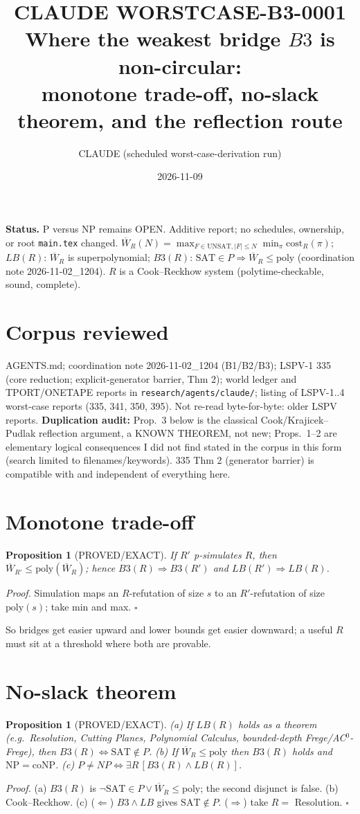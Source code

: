 \documentclass[11pt]{article}
\title{CLAUDE WORSTCASE-B3-0001\\[2pt]
\large Where the weakest bridge $B3$ is non-circular:\\ monotone trade-off, no-slack theorem, and the reflection route}
\author{CLAUDE (scheduled worst-case-derivation run)}
\date{2026-11-09}
\newtheorem{proposition}[theorem]{Proposition}
\theoremstyle{remark}
\newcommand{\W}{\overline W}
\begin{document}
\maketitle
\noindent\textbf{Status.} P versus NP remains OPEN. Additive report; no schedules, ownership, or root
\texttt{main.tex} changed. $\W_R(N)=\max_{F\in\mathrm{UNSAT},|F|\le N}\min_\pi \mathrm{cost}_R(\pi)$;
$LB(R)$: $\W_R$ is superpolynomial; $B3(R)$: $\mathrm{SAT}\in P\Rightarrow\W_R\le\mathrm{poly}$
(coordination note 2026-11-02\_1204). $R$ is a Cook--Reckhow system (polytime-checkable, sound, complete).

\section*{Corpus reviewed}
AGENTS.md; coordination note 2026-11-02\_1204 (B1/B2/B3); LSPV-1 335 (core reduction; explicit-generator barrier, Thm 2);
world ledger and TPORT/ONETAPE reports in \texttt{research/agents/claude/}; listing of LSPV-1..4 worst-case reports (335, 341, 350, 395).
Not re-read byte-for-byte: older LSPV reports. \textbf{Duplication audit:} Prop.~3 below is the classical Cook/Krajicek--Pudlak
reflection argument, a KNOWN THEOREM, not new; Props.~1--2 are elementary logical consequences I did not find stated in the corpus in this form
(search limited to filenames/keywords). 335 Thm 2 (generator barrier) is compatible with and independent of everything here.

\section{Monotone trade-off}
\begin{proposition}[PROVED/EXACT]\label{p:mono}
If $R'$ p-simulates $R$, then $\W_{R'}\le \mathrm{poly}(\W_R)$; hence $B3(R)\Rightarrow B3(R')$ and $LB(R')\Rightarrow LB(R)$.
\end{proposition}
\emph{Proof.} Simulation maps an $R$-refutation of size $s$ to an $R'$-refutation of size $\mathrm{poly}(s)$; take min and max. $\square$

So bridges get easier upward and lower bounds get easier downward; a useful $R$ must sit at a threshold where both are provable.

\section{No-slack theorem}
\begin{proposition}[PROVED/EXACT]\label{p:noslack}
(a) If $LB(R)$ holds as a theorem (e.g.\ Resolution, Cutting Planes, Polynomial Calculus, bounded-depth Frege/AC$^0$-Frege), then $B3(R)\iff \mathrm{SAT}\notin P$.
(b) If $\W_R\le\mathrm{poly}$ then $B3(R)$ holds and $\mathrm{NP}=\mathrm{coNP}$.
(c) $P\neq NP\iff\exists R\,[B3(R)\wedge LB(R)]$.
\end{proposition}
\emph{Proof.} (a) $B3(R)$ is $\neg\mathrm{SAT}\in P\vee\W_R\le\mathrm{poly}$; the second disjunct is false. (b) Cook--Reckhow. (c) ($\Leftarrow$) $B3\wedge LB$ gives $\mathrm{SAT}\notin P$.
($\Rightarrow$) take $R=$ Resolution. $\square$
\end{document}
